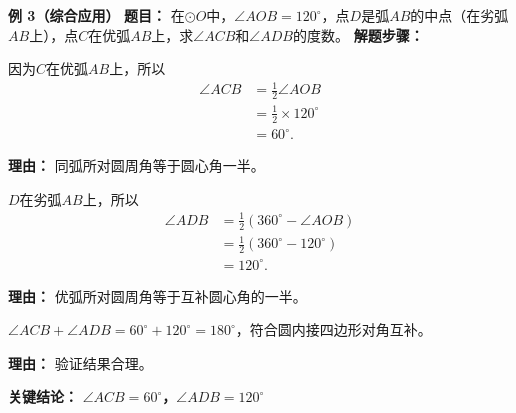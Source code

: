 \begin{examplebox}
	\medskip
	\textbf{\textcolor{CExample}{例 3（综合应用）}}
	\textbf{\textcolor{CExample}{题目：}}
	在$\odot O$中，$\angle AOB=120^\circ$，点$D$是弧$AB$的中点（在劣弧$AB$上），点$C$在优弧$AB$上，求$\angle ACB$和$\angle ADB$的度数。
	\textbf{\textcolor{CExample}{解题步骤：}}
	\begin{description}[style=nextline, leftmargin=2.8em, labelsep=0.5em, itemsep=0.45em]
		\item[\textbf{第一步（劣弧求角）：}]
			因为$C$在优弧$AB$上，所以
			\[
				\begin{aligned}
					\angle ACB &= \frac12\angle AOB \\ &= \frac12\times 120^\circ \\ &= 60^\circ.
			\end{aligned}
			\]
			\par\textbf{理由：} 同弧所对圆周角等于圆心角一半。
		\item[\textbf{第二步（优弧求角）：}]
			$D$在劣弧$AB$上，所以
			\[
				\begin{aligned}
					\angle ADB &= \frac12(360^\circ - \angle AOB) \\ &= \frac12(360^\circ - 120^\circ) \\ &= 120^\circ.
			\end{aligned}
			\]
			\par\textbf{理由：} 优弧所对圆周角等于互补圆心角的一半。
		\item[\textbf{第三步（结果验证）：}]
			$\angle ACB + \angle ADB = 60^\circ + 120^\circ = 180^\circ$，符合圆内接四边形对角互补。
			\par\textbf{理由：} 验证结果合理。
	\end{description}
	\textbf{\textcolor{CExample}{关键结论：}}
	\textbf{$\angle ACB = 60^\circ$，$\angle ADB = 120^\circ$}
\end{examplebox}
